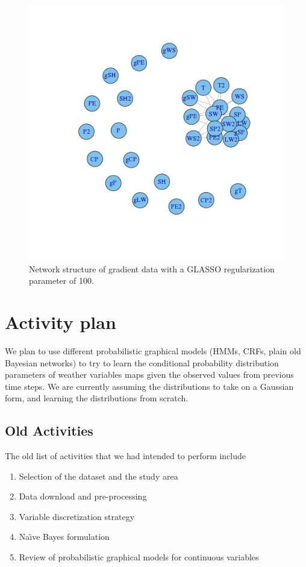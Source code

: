 \documentclass{article}
\begin{document}
\begin{figure}
\includegraphics[width=0.9\columnwidth]{images/grad_100.png}
\caption{Network structure of gradient data with a GLASSO regularization parameter of 100.}
\label{fig:grad_100}
\end{figure}

\section{Activity plan}

We plan to use different probabilistic graphical models (HMMs, CRFs, plain old
Bayesian networks) to try to learn the conditional probability distribution
parameters of weather variables maps given the observed values from previous
time steps. We are currently assuming the distributions to take on a Gaussian
form, and learning the distributions from scratch.

\subsection{Old Activities}
The old list of activities that we had intended to perform include
\begin{enumerate}
\item Selection of the dataset and the study area
\item Data download and pre-processing
\item Variable discretization strategy
\item Na\"\i ve Bayes formulation
\item Review of probabilistic graphical models for continuous variables
\end{enumerate}
\end{document}
